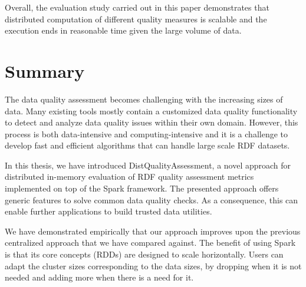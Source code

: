 Overall, the evaluation study carried out in this paper demonstrates that distributed computation of  different quality measures is scalable and the execution ends in reasonable time given the large volume of data.


\section{Summary}
\label{sec:distqualityassesment-summary}
The data quality assessment becomes challenging with the increasing sizes of data.
Many existing tools mostly contain a customized data quality functionality to detect and analyze data quality issues within their own domain. 
However, this process is both data-intensive and computing-intensive and it is a challenge to develop fast and efficient algorithms that can handle large scale \gls{RDF} datasets.

In this thesis, we have introduced DistQualityAssessment, a novel approach for distributed in-memory evaluation of \gls{RDF} quality assessment metrics implemented on top of the Spark framework.
The presented approach offers generic features to solve common data quality checks.
As a consequence, this can enable further applications to build trusted data utilities. 

We have demonstrated empirically that our approach improves upon the previous centralized approach that we have compared against.
The benefit of using Spark is that its core concepts (\gls{RDD}s) are designed to scale horizontally. 
Users can adapt the cluster sizes corresponding to the data sizes, by dropping when it is not needed and adding more when there is a need for it.